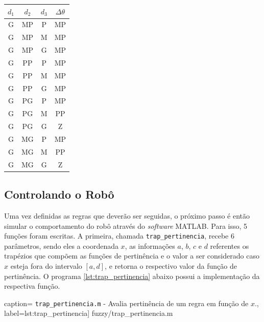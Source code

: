 \begin{table}[H]
\begin{minipage}{0.30\textwidth}
\begin{tabular}{| c | c | c | c |}
						\end{tabular}	
					\end{minipage}	
					\begin{minipage}{0.30\textwidth}
					    \centering
						\begin{tabular}{| c | c | c | c |} 
						\hline
						\(d_1\) & \(d_2\) & \(d_3\) & \(\Delta \theta\) \\ \hline
						G & MP & P & MP \\ \hline
						G & MP & M & MP \\ \hline
						G & MP & G & MP \\ \hline
						G & PP & P & MP \\ \hline
						G & PP & M & MP \\ \hline
						G & PP & G & MP  \\ \hline 	  	 
						G & PG & P & MP \\ \hline
						G & PG & M & PP \\ \hline
						G & PG & G & Z  \\ \hline
						G & MG & P & MP \\ \hline
						G & MG & M & PP \\ \hline
						G & MG & G & Z  \\ \hline
						\end{tabular}	
					\end{minipage}	      
			    \end{table}
	\FloatBarrier
	
	\subsection{Controlando o Robô}
	
	Uma vez definidas as regras que deverão ser seguidas, o próximo passo é então
	simular o comportamento do robô através do \textit{software} MATLAB. Para isso,
	5 funções foram escritas. A primeira, chamada \texttt{trap\_pertinencia},
	recebe 6 parâmetros, sendo eles a coordenada \(x\), as informações \(a\), \(b\), \(c\)
	e \(d\) referentes os trapézios que compõem as funções de pertinência e o valor
	a ser considerado caso \(x\) esteja fora do intervalo \(\left[a, d\right]\), e
	retorna o respectivo valor da função de pertinência. O programa
	\ref{lst:trap_pertinencia} abaixo possui a implementação da respectiva
	função.
	
	 caption={ \texttt{trap\_pertinencia.m} -
	Avalia pertinência de um regra em função de \(x\).},
	label={lst:trap_pertinencia}] {fuzzy/trap_pertinencia.m}
	
